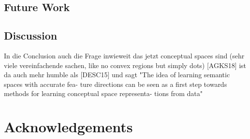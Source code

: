 \documentclass[11pt,
  paper=a4, 
  hidelinks,
  bibliography=totocnumbered,
	captions=tableheading,
	BCOR=10mm
]{scrreprt}
\theoremstyle{definition}
\begin{document}
\section{Future Work}




\section{Discussion}

In die Conclusion auch die Frage inwieweit das jetzt conceptual spaces sind (sehr viele vereinfachende sachen, like no convex regions but simply dots)
[AGKS18] ist da auch mehr humble als [DESC15] und sagt "The idea of learning semantic spaces with accurate fea- ture directions can be seen as a first step towards methods for learning conceptual space representa- tions from data"


\chapter*{Acknowledgements}



\glsaddall
\printglossaries %

	
	\appendix %
	
	
	


\printbibliography[heading=bibintoc]
\end{document}
